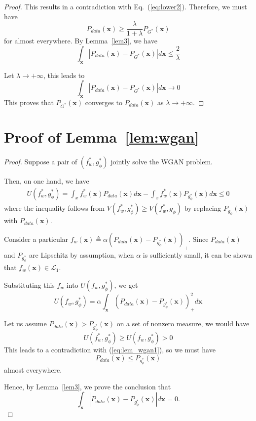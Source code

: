 \documentclass[11pt,fullpage, letterpaper,twoside]{article}
\newcommand{\1}[1]{\mathds{1}_{\left[#1\right]}}
\begin{document}
\begin{proof}
This results in a contradiction with Eq.~(\ref{eq:lower2}).
Therefore, we must have
\begin{equation}\label{eq:cond}
P_{data}(\mathbf x) \geq \dfrac{\lambda}{1+\lambda}P_{G^*}(\mathbf x)
\end{equation}
for almost everywhere.  By Lemma~\ref{lem3}, we have
$$
\int_{\mathbf x}|P_{data}(\mathbf x)-P_{G^*}(\mathbf x)|d\mathbf x \leq \dfrac{2}{\lambda}
$$

Let $\lambda\rightarrow +\infty$, this leads to
$$
\int_{\mathbf x}|P_{data}(\mathbf x)-P_{G^*}(\mathbf x)|d\mathbf x \rightarrow 0
$$
This proves that $P_{G^*}(\mathbf x)$ converges to $P_{data}(\mathbf x)$ as $\lambda\rightarrow +\infty$.
\end{proof}

\section{Proof of Lemma~\ref{lem:wgan}}\label{appendixC}
\begin{proof}
Suppose a pair of $(f_w^*, g_\phi^*)$ jointly solve the WGAN problem.

Then, on one hand, we have
\begin{align}\label{eq:lem_wgan1}
U(f_w^*,g_\phi^*)=\int_x f_w^*(\mathbf x) P_{data}(\mathbf x)d\mathbf x - \int_x f_w^* (\mathbf x)P_{g_\phi^*}(\mathbf x)d\mathbf x\leq 0
\end{align}
where the inequality follows from $V(f_w^*,g_\phi^*)\geq V(f_w^*,g_\phi)$ by replacing $P_{g_\phi}(\mathbf x)$ with $P_{data}(\mathbf x)$.

Consider a particular $f_w(\mathbf x)\triangleq \alpha(P_{data}(\mathbf x)-P_{g_\phi^*}(\mathbf x))_+$.  Since $P_{data}(\mathbf x)$ and $P_{g_\phi^*}$ are Lipschitz by assumption, when $\alpha$ is sufficiently small, it can be shown that $f_w(\mathbf x)\in\mathcal L_1$.

Substituting this $f_w$ into $U(f_w, g_\phi^*)$, we get
$$
U(f_w,g_\phi^*)=\alpha \int_\mathbf x (P_{data}(\mathbf x)-P_{g_\phi^*}(\mathbf x))_+^2 d\mathbf x
$$

Let us assume $P_{data}(\mathbf x) > P_{g_\phi^*}(\mathbf x)$ on a set of nonzero measure, we would have
$$
U(f_w^*,g_\phi^*)\geq U(f_w,g_\phi^*) > 0
$$
This leads to a contradiction with (\ref{eq:lem_wgan1}), so we must have
$$
P_{data}(\mathbf x) \leq P_{g_\phi^*}(\mathbf x)
$$
almost everywhere.

Hence, by Lemma~\ref{lem3}, we prove the conclusion that
$$
\int_{\mathbf x}|P_{data}(\mathbf x)-P_{g_\phi^*}(\mathbf x)|d\mathbf x=0.
$$
\end{proof}
\end{document}
